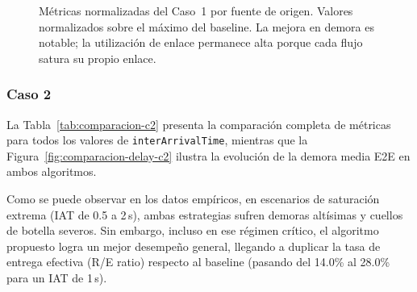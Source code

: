 \documentclass[10pt,letterpaper,twocolumn]{article}
\begin{document}
\begin{figure}[!t]
  \centering
  \caption{Métricas normalizadas del Caso~1 por fuente de origen.
           Valores normalizados sobre el máximo del baseline.
           La mejora en demora es notable; la utilización de enlace
           permanece alta porque cada flujo satura su propio enlace.}
  \label{fig:comparacion-c1}
\end{figure}

\subsubsection*{Caso 2}

La Tabla~\ref{tab:comparacion-c2} presenta la comparación completa de métricas para todos los valores de \texttt{interArrivalTime}, mientras que la Figura~\ref{fig:comparacion-delay-c2} ilustra la evolución de la demora media E2E en ambos algoritmos.

Como se puede observar en los datos empíricos, en escenarios de saturación extrema (IAT de 0.5 a 2\,s), ambas estrategias sufren demoras altísimas y cuellos de botella severos. Sin embargo, incluso en ese régimen crítico, el algoritmo propuesto logra un mejor desempeño general, llegando a duplicar la tasa de entrega efectiva (R/E ratio) respecto al baseline (pasando del 14.0\% al 28.0\% para un IAT de 1\,s).
\end{document}
